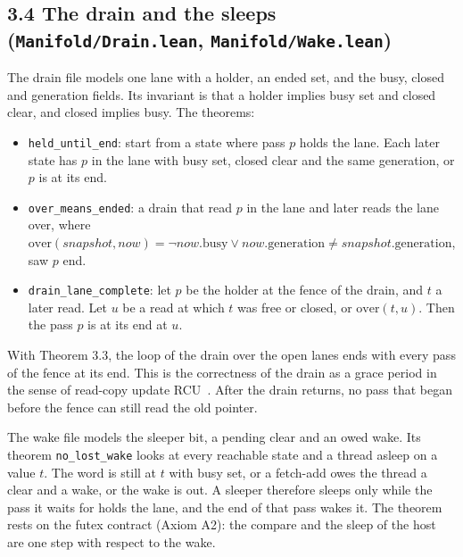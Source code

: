 \subsection{\texorpdfstring{3.4 The drain and the sleeps (\texttt{Manifold/\allowbreak{}Drain.\allowbreak{}lean}, \texttt{Manifold/\allowbreak{}Wake.\allowbreak{}lean})}{3.4 The drain and the sleeps (Manifold/Drain.lean, Manifold/Wake.lean)}}

The drain file models one lane with a holder, an ended set, and the busy, closed and generation fields. Its invariant is that a holder implies busy set and closed clear, and closed implies busy. The theorems:

\begin{itemize}
\item \texttt{held\_\allowbreak{}until\_\allowbreak{}end}: start from a state where pass \(p\) holds the lane. Each later state has \(p\) in the lane with busy set, closed clear and the same generation, or \(p\) is at its end.
\item \texttt{over\_\allowbreak{}means\_\allowbreak{}ended}: a drain that read \(p\) in the lane and later reads the lane over, where \(\mathrm{over}(\mathit{snapshot}, \mathit{now}) = \neg \mathit{now}.\mathrm{busy} \lor \mathit{now}.\mathrm{generation} \neq \mathit{snapshot}.\mathrm{generation}\), saw \(p\) end.
\item \texttt{drain\_\allowbreak{}lane\_\allowbreak{}complete}: let \(p\) be the holder at the fence of the drain, and \(t\) a later read. Let \(u\) be a read at which \(t\) was free or closed, or \(\mathrm{over}(t, u)\). Then the pass \(p\) is at its end at \(u\).
\end{itemize}

With Theorem 3.3, the loop of the drain over the open lanes ends with every pass of the fence at its end. This is the correctness of the drain as a grace period in the sense of read-copy update RCU~\cite{src:RCU}. After the drain returns, no pass that began before the fence can still read the old pointer.

The wake file models the sleeper bit, a pending clear and an owed wake. Its theorem \texttt{no\_\allowbreak{}lost\_\allowbreak{}wake} looks at every reachable state and a thread asleep on a value \(t\). The word is still at \(t\) with busy set, or a fetch-add owes the thread a clear and a wake, or the wake is out. A sleeper therefore sleeps only while the pass it waits for holds the lane, and the end of that pass wakes it. The theorem rests on the futex contract (Axiom A2): the compare and the sleep of the host are one step with respect to the wake.

